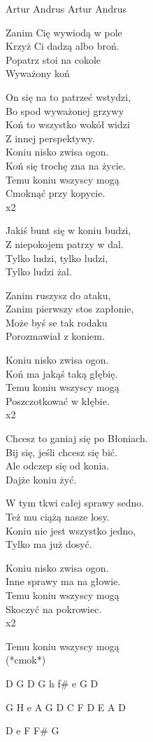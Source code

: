 {Artur Andrus}
{Artur Andrus}
\begin{text}
Zanim Cię wywiodą w pole\\
Krzyż Ci dadzą albo broń.\\
Popatrz stoi na cokole\\
Wyważony koń

On się na to patrzeć wstydzi,\\
Bo spod wyważonej grzywy \\
Koń to wszystko wokół widzi\\
Z innej perspektywy.\\

Koniu nisko zwisa ogon.\\
Koń się trochę zna na życie.\\
Temu koniu wszyscy mogą\\
Cmoknąć przy kopycie.\\
x2

Jakiś bunt się w koniu budzi,\\
Z niepokojem patrzy w dal.\\
Tylko ludzi, tylko ludzi,\\
Tylko ludzi żal.

Zanim ruszysz do ataku,\\
Zanim pierwszy stos zapłonie,\\
Może byś se tak rodaku\\
Porozmawiał z koniem.

Koniu nisko zwisa ogon.\\
Koń ma jakąś taką głębię.\\
Temu koniu wszyscy mogą\\
Poszczotkować w kłębie.\\
x2

Chcesz to ganiaj się po Błoniach.\\
Bij się, jeśli chcesz się bić.\\
Ale odczep się od konia.\\
Dajże koniu żyć.

W tym tkwi całej sprawy sedno.\\
Też mu ciążą nasze losy.\\
Koniu nie jest wszystko jedno,\\
Tylko ma już dosyć.

Koniu nisko zwisa ogon.\\
Inne sprawy ma na głowie.\\
Temu koniu wszyscy mogą\\
Skoczyć na pokrowiec.\\
x2

Temu koniu wszyscy mogą\\
(*cmok*)
\end{text}
\begin{chord}
D G
D G
h f# e G D

G H
e A G
D C F D
E A D

D e F F# G
\end{chord}

